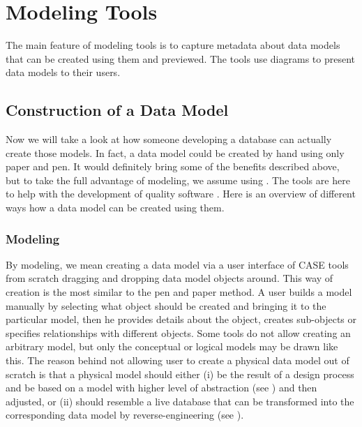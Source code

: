 \chapter{Modeling Tools}
\label{modeling_tools}

The main feature of modeling tools is to capture metadata about data models that can be created using them and previewed. The tools use diagrams to present data models to their users.

\section{Construction of a Data Model}

Now we will take a look at how someone developing a database can actually create those models.
In fact, a data model could be created by hand using only paper and pen. It would definitely bring some of the benefits described above, but to take the full advantage of modeling, we assume using . The tools are here to help with the development of quality software \cite{CASETools}. 
Here is an overview of different ways how a data model can be created using them.

\subsection{Modeling}

By modeling, we mean creating a data model via a user interface of CASE tools from scratch dragging and dropping data model objects around. 
This way of creation is the most similar to the pen and paper method. A user builds a model manually by selecting what object should be created and bringing it to the particular model, then he provides details about the object, creates sub-objects or specifies relationships with different objects.
Some tools do not allow creating an arbitrary model, but only the conceptual or logical models may be drawn like this. 
The reason behind not allowing user to create a physical data model out of scratch is that a physical model should either (i) be the result of a design process and be based on a model with higher level of abstraction (see ) and then adjusted, or (ii) should resemble a live database that can be transformed into the corresponding data model by reverse-engineering (see ).

